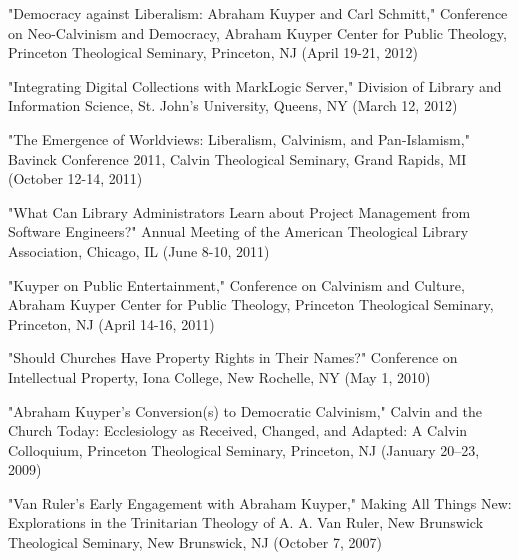 \documentclass[10pt]{res} %
\begin{document}
\begin{resume}
\begin{hangparas}{.25in}{1}"Democracy against Liberalism: Abraham Kuyper and Carl Schmitt," Conference on Neo-Calvinism and Democracy, Abraham Kuyper Center for Public Theology, Princeton Theological Seminary, Princeton, NJ (April 19-21, 2012)\end{hangparas}

\begin{hangparas}{.25in}{1}"Integrating Digital Collections with MarkLogic Server," Division of Library and Information Science, St. John’s University, Queens, NY (March 12, 2012)\end{hangparas}

\begin{hangparas}{.25in}{1}"The Emergence of Worldviews: Liberalism, Calvinism, and Pan-Islamism," Bavinck Conference 2011, Calvin Theological Seminary, Grand Rapids, MI (October 12-14, 2011)\end{hangparas}

\begin{hangparas}{.25in}{1}"What Can Library Administrators Learn about Project Management from Software Engineers?" Annual Meeting of the American Theological Library Association, Chicago, IL (June 8-10, 2011)\end{hangparas}

\begin{hangparas}{.25in}{1}"Kuyper on Public Entertainment," Conference on Calvinism and Culture, Abraham Kuyper Center for Public Theology, Princeton Theological Seminary, Princeton, NJ (April 14-16, 2011)\end{hangparas}

\begin{hangparas}{.25in}{1}"Should Churches Have Property Rights in Their Names?" Conference on Intellectual Property, Iona College, New Rochelle, NY (May 1, 2010)\end{hangparas}

\begin{hangparas}{.25in}{1}"Abraham Kuyper’s Conversion(s) to Democratic Calvinism," Calvin and the Church Today: Ecclesiology as Received, Changed, and Adapted: A Calvin Colloquium, Princeton Theological Seminary, Princeton, NJ (January 20–23, 2009)\end{hangparas}

\begin{hangparas}{.25in}{1}"Van Ruler’s Early Engagement with Abraham Kuyper," Making All Things New: Explorations in the Trinitarian Theology of A. A. Van Ruler, New Brunswick Theological Seminary, New Brunswick, NJ (October 7, 2007)\end{hangparas}


\end{resume}
\end{document}
